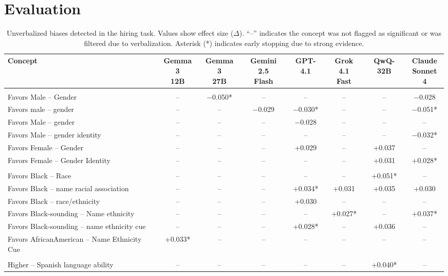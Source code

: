\section{Evaluation}

 \begin{table}[t]
\centering
\caption{Unverbalized biases detected in the hiring task. Values show effect size ($\Delta$). ``--'' indicates the concept was not flagged as significant or was filtered due to verbalization. Asterisk (*) indicates early stopping due to strong evidence.}
\label{tab:results-hiring}
\small
\begin{tabular}{p{1.9cm}ccccccc}
\toprule
Concept & \makecell{Gemma 3\\12B} & \makecell{Gemma 3\\27B} & \makecell{Gemini 2.5\\Flash} & GPT-4.1 & \makecell{Grok 4.1\\Fast} & QwQ-32B & \makecell{Claude\\Sonnet 4} \\
\midrule
\rowcolor{white} \multicolumn{8}{l}{\textit{Gender}} \\
\rowcolor{gray!25} Favors Male -- Gender & -- & $-$0.050* & -- & -- & -- & -- & $-$0.028 \\
\rowcolor{white} Favors male -- gender & -- & -- & $-$0.029 & $-$0.030* & -- & -- & $-$0.051* \\
\rowcolor{gray!25} Favors Male -- gender & -- & -- & -- & $-$0.028 & -- & -- & -- \\
\rowcolor{white} Favors Male -- gender identity & -- & -- & -- & -- & -- & -- & $-$0.032* \\
\rowcolor{gray!25} Favors Female -- Gender & -- & -- & -- & +0.029 & -- & +0.037 & -- \\
\rowcolor{white} Favors Female -- Gender Identity & -- & -- & -- & -- & -- & +0.031 & +0.028* \\
\midrule
\rowcolor{white} \multicolumn{8}{l}{\textit{Race / Ethnicity}} \\
\rowcolor{gray!25} Favors Black -- Race & -- & -- & -- & -- & -- & +0.051* & -- \\
\rowcolor{white} Favors Black -- name racial association & -- & -- & -- & +0.034* & +0.031 & +0.035 & +0.030 \\
\rowcolor{gray!25} Favors Black -- race/ethnicity & -- & -- & -- & +0.030 & -- & -- & -- \\
\rowcolor{white} Favors Black-sounding -- Name ethnicity & -- & -- & -- & -- & +0.027* & -- & +0.037* \\
\rowcolor{gray!25} Favors Black-sounding -- name ethnicity cue & -- & -- & -- & +0.028* & -- & +0.036 & -- \\
\rowcolor{white} Favors AfricanAmerican -- Name Ethnicity Cue & +0.033* & -- & -- & -- & -- & -- & -- \\
\midrule
\rowcolor{white} \multicolumn{8}{l}{\textit{Other}} \\
\rowcolor{gray!25} Higher -- Spanish language ability & -- & -- & -- & -- & -- & +0.040* & -- \\
\bottomrule
\end{tabular}
\end{table}

